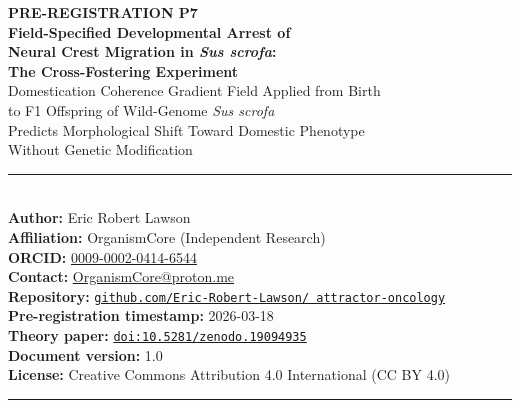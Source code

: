 \documentclass[10pt, a4paper]{article}
\begin{document}
\begin{center}
  {\LARGE\bfseries\color{headergreen}
  PRE-REGISTRATION P7}\\[0.4em]
  {\Large\bfseries
  Field-Specified Developmental Arrest of\\
  Neural Crest Migration in \textit{Sus scrofa}:}\\[0.3em]
  {\large\bfseries
  The Cross-Fostering Experiment}\\[0.4em]
  {\large
  Domestication Coherence Gradient Field Applied
  from Birth\\
  to F1 Offspring of Wild-Genome \textit{Sus scrofa}\\
  Predicts Morphological Shift Toward Domestic
  Phenotype\\
  Without Genetic Modification}\\[0.6em]
  \noindent\textcolor{rulecolor}
  {\rule{\linewidth}{1pt}}\\[0.4em]
  {\normalsize
  \textbf{Author:} Eric Robert Lawson\\
  \textbf{Affiliation:} OrganismCore
  (Independent Research)\\
  \textbf{ORCID:}
  \href{https://orcid.org/0009-0002-0414-6544}
  {0009-0002-0414-6544}\\
  \textbf{Contact:}
  \href{mailto:OrganismCore@proton.me}
  {OrganismCore@proton.me}\\
  \textbf{Repository:}
  \href{https://github.com/Eric-Robert-Lawson/attractor-oncology}
  {\texttt{github.com/Eric-Robert-Lawson/
  attractor-oncology}}\\
  \textbf{Pre-registration timestamp:} 2026-03-18\\
  \textbf{Theory paper:}
  \href{https://doi.org/10.5281/zenodo.19094935}
  {\texttt{doi:10.5281/zenodo.19094935}}\\
  \textbf{Document version:} 1.0\\
  \textbf{License:}
  Creative Commons Attribution 4.0
  International (CC BY 4.0)}\\[0.4em]
  \noindent\textcolor{rulecolor}
  {\rule{\linewidth}{1pt}}
\end{center}

\vspace{0.5em}
\end{document}
